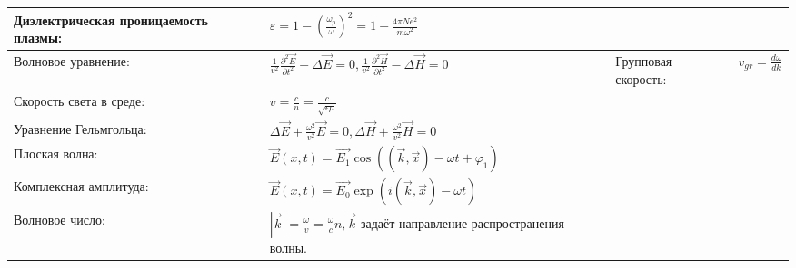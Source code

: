 \documentclass{article}
\begin{document}
\begin{tabular}{ |p{4.1cm}|p{5.4cm}|p{4.1cm}|p{4.4cm}|  }
Диэлектрическая проницаемость плазмы:                                        &  %
$\varepsilon = 1 - (\frac{\omega_p}{\omega})^2 =
 1 - \frac{4 \pi N e^2}{m \omega^2}$                                         \\ %
\hline
Волновое уравнение:                                                          &  %
$\frac{1}{v^2} \frac{\partial^2 \vec{E}}{\partial t^2} - \Delta \vec{E} = 0,
\frac{1}{v^2} \frac{\partial^2 \vec{H}}{\partial t^2} - \Delta \vec{H} = 0$  &  %
Групповая скорость:                                                          &  %
$v_{gr} = \frac{d \omega}{d k}$                                                 \\ %
\hline
Скорость света в среде:                                                      &  %
$v = \frac{c}{n} = \frac{c}{\sqrt{\epsilon\mu}}$                             &  %
                                                                             &  %
                                                                             \\ %
\hline
Уравнение Гельмгольца:                                                       &  %
$\Delta \vec{E} + \frac{\omega^2}{v^2} \vec{E} = 0,
\Delta \vec{H} + \frac{\omega^2}{v^2} \vec{H} = 0$                           &  %
                                                                             &  %
                                                                             \\ %
\hline
Плоская волна:                                                               &  %
$\vec{E}(x, t) = \vec{E_1} \cos((\vec{k}, \vec{x}) - \omega t + \varphi_1)$  &  %
                                                                             &  %
                                                                             \\ %
\hline
Комплексная амплитуда:                                                       &  %
$\vec{E}(x, t) = \vec{E_0} \exp(i(\vec{k}, \vec{x}) - \omega t)$             &  %
                                                                             &  %
                                                                             \\ %
\hline
Волновое число:                                                              &  %
$|\vec{k}| = \frac{\omega}{v} = \frac{\omega}{c} n, \vec{k}$ задаёт
 направление распространения волны.                                          &  %

\end{tabular}
\end{document}
